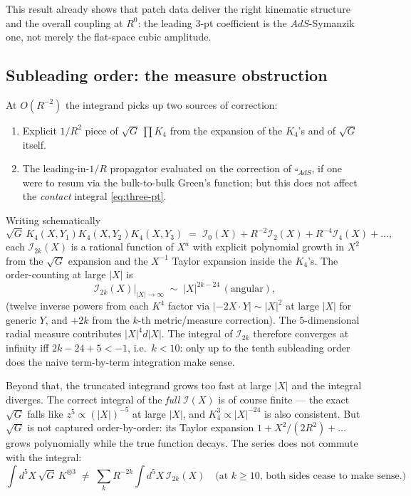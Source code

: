 \documentclass[11pt]{article}
\renewcommand{\Box}{\square}
\begin{document}
This result already shows that patch data deliver the right kinematic structure and the overall coupling at $R^0$: the leading 3-pt coefficient is the $AdS$-Symanzik one, not merely the flat-space cubic amplitude.

\subsection{Subleading order: the measure obstruction}

At $O(R^{-2})$ the integrand picks up two sources of correction:
\begin{enumerate}
\item Explicit $1/R^2$ piece of $\sqrt{G}\,\prod K_4$ from the expansion of the $K_4$'s and of $\sqrt{G}$ itself.
\item The leading-in-$1/R$ propagator evaluated on the correction of $\Box_{AdS}$, if one were to resum via the bulk-to-bulk Green's function; but this does not affect the \emph{contact} integral \cref{eq:three-pt}.
\end{enumerate}
Writing schematically
\begin{equation}
\sqrt{G}\,K_4(X,Y_1)K_4(X,Y_2)K_4(X,Y_3) \;=\; \mathcal{I}_0(X) + R^{-2}\mathcal{I}_2(X) + R^{-4}\mathcal{I}_4(X) + \ldots,
\end{equation}
each $\mathcal{I}_{2k}(X)$ is a rational function of $X^a$ with explicit polynomial growth in $X^2$ from the $\sqrt{G}$ expansion and the $X^{-1}$ Taylor expansion inside the $K_4$'s. The order-counting at large $|X|$ is
\begin{equation}
    \mathcal{I}_{2k}(X)\big|_{|X|\to\infty} \;\sim\; |X|^{2k-24}\,(\text{angular}),
\end{equation}
(twelve inverse powers from each $K^4$ factor via $|-2X\cdot Y|\sim|X|^{2}$ at large $|X|$ for generic $Y$, and $+2k$ from the $k$-th metric/measure correction). The $5$-dimensional radial measure contributes $|X|^4 d|X|$. The integral of $\mathcal{I}_{2k}$ therefore converges at infinity iff $2k-24+5 < -1$, i.e.~$k<10$: only up to the tenth subleading order does the naive term-by-term integration make sense.

Beyond that, the truncated integrand grows too fast at large $|X|$ and the integral diverges. The correct integral of the \emph{full} $\mathcal{I}(X)$ is of course finite --- the exact $\sqrt{G}$ falls like $z^5\propto(|X|)^{-5}$ at large $|X|$, and $K_4^3\propto|X|^{-24}$ is also consistent. But $\sqrt{G}$ is not captured order-by-order: its Taylor expansion $1 + X^2/(2R^2) + \ldots$ grows polynomially while the true function decays. The series does not commute with the integral:
\begin{equation}
    \int\!d^5X\,\sqrt{G}\,K^{\otimes 3} \;\neq\; \sum_k R^{-2k}\!\int\!d^5X\,\mathcal{I}_{2k}(X)\quad\text{(at }k\geq 10\text{, both sides cease to make sense.)}
\end{equation}
\end{document}
